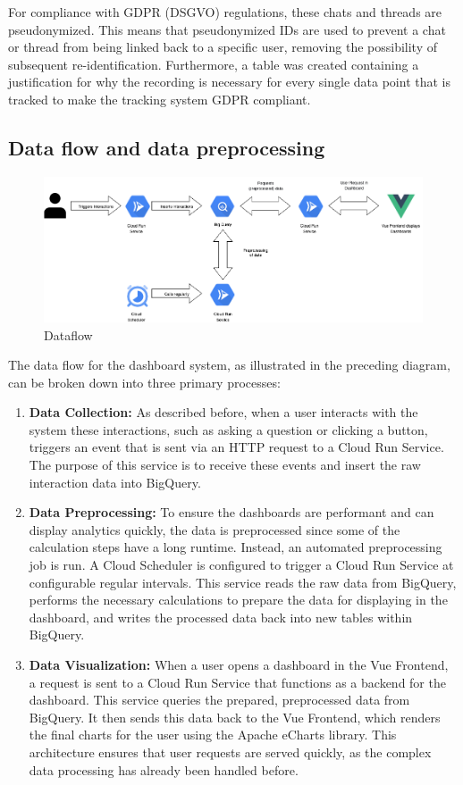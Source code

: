 \documentclass[
	english,
	ruledheaders=section,%
	class=report,%
	thesis={type=bachelor},%
	accentcolor=1b,%
	custommargins=true,%
	marginpar=false,%
	parskip=half-,%
	fontsize=11pt,%
	DIV=14,
]{tudapub}
\begin{document}
For compliance with GDPR (DSGVO) \parencite{DSGVO_2024} regulations, these chats and threads are pseudonymized. This means that pseudonymized IDs are used to prevent a chat or thread from being linked back to a specific user, removing the possibility of subsequent re-identification. Furthermore, a table was created containing a justification for why the recording is necessary for every single data point that is tracked to make the tracking system GDPR compliant.
\subsection{Data flow and data preprocessing}
\begin{figure}
    \centering
    \includegraphics[width=1\linewidth]{images/DataFlow_Bachelorthesis.drawio.png}
    \caption{Dataflow}
    \label{fig:enter-label}
\end{figure}
The data flow for the dashboard system, as illustrated in the preceding diagram, can be broken down into three primary processes:

\begin{enumerate}
    \item \textbf{Data Collection:} As described before, when a user interacts with the system these interactions, such as asking a question or clicking a button, triggers an event that is sent via an HTTP request to a Cloud Run Service. The purpose of this service is to receive these events and insert the raw interaction data into BigQuery.

    \item \textbf{Data Preprocessing:} To ensure the dashboards are performant and can display analytics quickly, the data is preprocessed since some of the calculation steps have a long runtime. Instead, an automated preprocessing job is run. A Cloud Scheduler \parencite{googlecloudscheduler} is configured to trigger a Cloud Run Service at configurable regular intervals. This service reads the raw data from BigQuery, performs the necessary calculations to prepare the data for displaying in the dashboard, and writes the processed data back into new tables within BigQuery.

    \item \textbf{Data Visualization:} When a user opens a dashboard in the Vue Frontend, a request is sent to a Cloud Run Service that functions as a backend for the dashboard. This service queries the prepared, preprocessed data from BigQuery. It then sends this data back to the Vue Frontend, which renders the final charts for the user using the Apache eCharts \parencite{apache_echarts} library. This architecture ensures that user requests are served quickly, as the complex data processing has already been handled before.
\end{enumerate}
\end{document}
